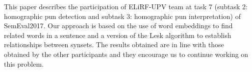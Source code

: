 This paper describes the participation of ELiRF-UPV team at task 7 (subtask 2: homographic pun detection and subtask 3: homographic pun interpretation) of SemEval2017. Our approach is based on the use of word embeddings to find related words in a sentence and a version of the Lesk algorithm to establish relationships between synsets. The results obtained are in line with those obtained by the other participants and they encourage us to continue working on this problem.
